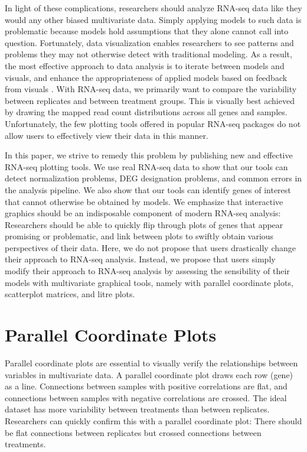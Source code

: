 \documentclass{bioinfo}
\begin{document}
In light of these complications, researchers should analyze RNA-seq data like they would any other biased multivariate data. Simply applying models to such data is problematic because models hold assumptions that they alone cannot call into question. Fortunately, data visualization enables researchers to see patterns and problems they may not otherwise detect with traditional modeling. As a result, the most effective approach to data analysis is to iterate between models and visuals, and enhance the appropriateness of applied models based on feedback from visuals \citep{Shneiderman}. With RNA-seq data, we primarily want to compare the variability between replicates and between treatment groups. This is visually best achieved by drawing the mapped read count distributions across all genes and samples. Unfortunately, the few plotting tools offered in popular RNA-seq packages do not allow users to effectively view their data in this manner.

In this paper, we strive to remedy this problem by publishing new and effective RNA-seq plotting tools. We use real RNA-seq data to show that our tools can detect normalization problems, DEG designation problems, and common errors in the analysis pipeline. We also show that our tools can identify genes of interest that cannot otherwise be obtained by models. We emphasize that interactive graphics should be an indisposable component of modern RNA-seq analysis: Researchers should be able to quickly flip through plots of genes that appear promising or problematic, and link between plots to swiftly obtain various perspectives of their data. Here, we do not propose that users drastically change their approach to RNA-seq analysis. Instead, we propose that users simply modify their approach to RNA-seq analysis by assessing the sensibility of their models with multivariate graphical tools, namely with parallel coordinate plots, scatterplot matrices, and litre plots.

\section{Parallel Coordinate Plots}

Parallel coordinate plots are essential to visually verify the relationships between variables in multivariate data. A parallel coordinate plot draws each row (gene) as a line. Connections between samples with positive correlations are flat, and connections between samples with negative correlations are crossed. The ideal dataset has more variability between treatments than between replicates. Researchers can quickly confirm this with a parallel coordinate plot: There should be flat connections between replicates but crossed connections between treatments.
\end{document}
